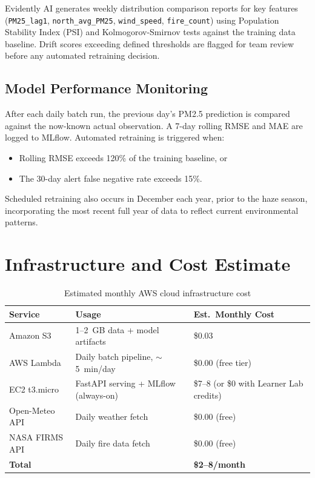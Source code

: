 \documentclass[12pt,a4paper]{report}
\begin{document}
Evidently AI generates weekly distribution comparison reports for key features (\texttt{PM25\_lag1}, \texttt{north\_avg\_PM25}, \texttt{wind\_speed}, \texttt{fire\_count}) using Population Stability Index (PSI) and Kolmogorov-Smirnov tests against the training data baseline. Drift scores exceeding defined thresholds are flagged for team review before any automated retraining decision.

\subsection{Model Performance Monitoring}

After each daily batch run, the previous day's PM2.5 prediction is compared against the now-known actual observation. A 7-day rolling RMSE and MAE are logged to MLflow. Automated retraining is triggered when:
\begin{itemize}
  \item Rolling RMSE exceeds 120\% of the training baseline, or
  \item The 30-day alert false negative rate exceeds 15\%.
\end{itemize}

Scheduled retraining also occurs in December each year, prior to the haze season, incorporating the most recent full year of data to reflect current environmental patterns.

\section{Infrastructure and Cost Estimate}

\begin{table}[H]
\centering
\caption{Estimated monthly AWS cloud infrastructure cost}
\label{tab:cost}
\begin{tabularx}{\textwidth}{@{}p{3cm}Xp{4cm}@{}}
\toprule
\textbf{Service} & \textbf{Usage} & \textbf{Est.\ Monthly Cost} \\
\midrule
Amazon S3           & 1--2~GB data + model artifacts            & \$0.03 \\
AWS Lambda          & Daily batch pipeline, $\sim$5~min/day     & \$0.00 (free tier) \\
EC2 t3.micro        & FastAPI serving + MLflow (always-on)      & \$7--8 (or \$0 with Learner Lab credits) \\
Open-Meteo API      & Daily weather fetch                       & \$0.00 (free) \\
NASA FIRMS API      & Daily fire data fetch                     & \$0.00 (free) \\
\midrule
\textbf{Total}      &                                           & \textbf{\$2--8/month} \\
\bottomrule
\end{tabularx}
\end{table}
\end{document}
